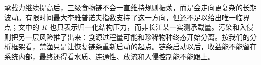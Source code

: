 承载力继续提高后，三级食物链不会一直维持规则振荡，而是会走向更复杂的长期波动。有限时间最大李雅普诺夫指数支持了这一方向，但还不足以给出唯一临界点；文中的 $K$ 也只表示归一化结构压力，而非长江某一实测承载量。污染和入侵则把另一层风险推了出来：食源过程量可能和珍稀物种终态开始分离。按我们的分析框架看，禁渔只是让恢复链条重新启动的起点。链条启动以后，收益能不能留在系统内部，最终还得看水质、连通性、放流和入侵控制能不能跟上。
